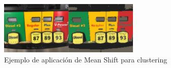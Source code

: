 \begin{figure}
    \centering
    \includegraphics[width=0.6\textwidth]{images/clustering}
    \caption{Ejemplo de aplicación de Mean Shift para clustering}
    \label{fig:clustering}
\end{figure}